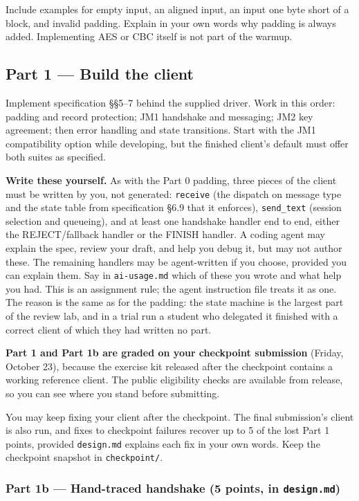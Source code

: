\documentclass[11pt]{article}
\begin{document}
Include examples for empty input, an aligned input, an input one byte short of a block, and invalid padding. Explain in your own words why padding is always added. Implementing AES or CBC itself is not part of the warmup.

\subsection*{Part 1 --- Build the client}

Implement specification \S{}\S{}5--7 behind the supplied driver. Work in this order: padding and record protection; JM1 handshake and messaging; JM2 key agreement; then error handling and state transitions. Start with the JM1 compatibility option while developing, but the finished client's default must offer both suites as specified.

\textbf{Write these yourself.} As with the Part 0 padding, three pieces of the client must be written by you, not generated: \texttt{receive} (the dispatch on message type and the state table from specification \S{}6.9 that it enforces), \texttt{send\_text} (session selection and queueing), and at least one handshake handler end to end, either the REJECT/fallback handler or the FINISH handler. A coding agent may explain the spec, review your draft, and help you debug it, but may not author these. The remaining handlers may be agent-written if you choose, provided you can explain them. Say in \texttt{ai-{}usage.md} which of these you wrote and what help you had. This is an assignment rule; the agent instruction file treats it as one. The reason is the same as for the padding: the state machine is the largest part of the review lab, and in a trial run a student who delegated it finished with a correct client of which they had written no part.

\textbf{Part 1 and Part 1b are graded on your checkpoint submission} (Friday, October 23), because the exercise kit released after the checkpoint contains a working reference client. The public eligibility checks are available from release, so you can see where you stand before submitting.

You may keep fixing your client after the checkpoint. The final submission's client is also run, and fixes to checkpoint failures recover up to 5 of the lost Part 1 points, provided \texttt{design.md} explains each fix in your own words. Keep the checkpoint snapshot in \texttt{checkpoint/}.

\subsubsection*{Part 1b --- Hand-traced handshake (5 points, in \texttt{design.md})}
\end{document}

